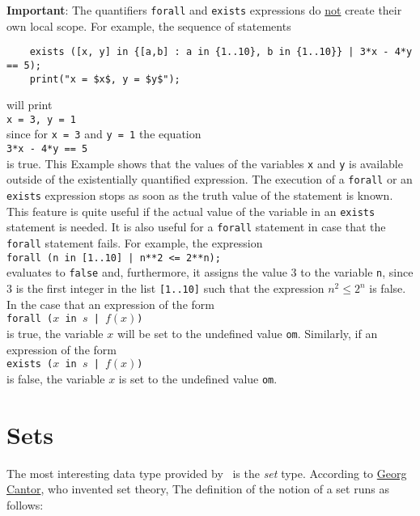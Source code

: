 \noindent
\textbf{Important}:  The quantifiers \texttt{forall} and \texttt{exists} expressions do \underline{not}
create their own local scope.  For example, the sequence of statements
\begin{verbatim}
    exists ([x, y] in {[a,b] : a in {1..10}, b in {1..10}} | 3*x - 4*y == 5);
    print("x = $x$, y = $y$");
\end{verbatim}
will print
\\[0.2cm]
\hspace*{1.3cm}
\texttt{x = 3, y = 1}
\\[0.2cm]
since for \texttt{x = 3} and \texttt{y = 1} the equation
\\[0.2cm]
\hspace*{1.3cm}
\texttt{3*x - 4*y == 5}
\\[0.2cm]
is true.
This Example shows that the values of the variables \texttt{x} and \texttt{y} is available
outside of the existentially quantified expression.  The execution of
a \texttt{forall} or an \texttt{exists} expression stops as soon as the
truth value of the statement is known.
This feature is quite useful if the actual value of the variable in an \texttt{exists}
statement is needed.  It is also useful for a \texttt{forall} statement in case that the
\texttt{forall} statement fails.  For example, the expression
\\[0.2cm]
\hspace*{1.3cm}
\texttt{forall (n in [1..10] | n**2 <= 2**n);}
\\[0.2cm]
evaluates to \texttt{false} and, furthermore, it assigns the value $3$ to the variable \texttt{n},
since $3$ is the first integer in the list \texttt{[1..10]}
such that the expression $n^2 \leq 2^n$ is false.  In the case that an expression of the form
\\[0.2cm]
\hspace*{1.3cm}
\texttt{forall ($x$ in $s$ | $f(x)$)}
\\[0.2cm]
is true,  the variable $x$ will be set to the undefined value \texttt{om}.  Similarly, if an
expression of the form
\\[0.2cm]
\hspace*{1.3cm}
\texttt{exists ($x$ in $s$ | $f(x)$)}
\\[0.2cm]
is false, the variable $x$ is set  to the undefined value \texttt{om}.

\section{Sets}
The most interesting data type provided by \setlx\ is the \emph{set} type.  
According to \href{https://en.wikipedia.org/wiki/Georg_Cantor}{Georg Cantor}, who invented set
theory, The definition of the notion of a set runs as follows:
\vspace*{0.4cm}

